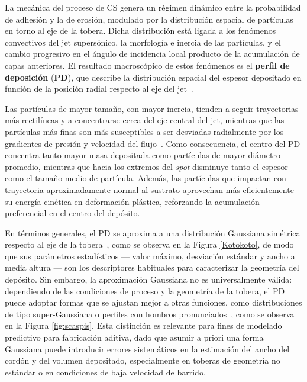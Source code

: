 La mecánica del proceso de CS genera un régimen dinámico entre la probabilidad de adhesión y la 
de erosión, modulado por la distribución espacial de partículas en 
torno al eje de la tobera. Dicha distribución está ligada a los 
fenómenos convectivos del jet supersónico, la morfología e inercia 
de las partículas, y el cambio progresivo en el ángulo de incidencia 
local producto de la acumulación de capas anteriores. El resultado 
macroscópico de estos fenómenos es el \textbf{perfil de deposición} 
(\textbf{PD}), que describe la distribución espacial del espesor 
depositado en función de la posición radial respecto al eje del 
jet~\cite{Papyrin2007}.

Las partículas de mayor tamaño, con mayor inercia, tienden a seguir 
trayectorias más rectilíneas y a concentrarse cerca del eje central 
del jet, mientras que las partículas más finas son más susceptibles 
a ser desviadas radialmente por los gradientes de presión y velocidad 
del flujo~\cite{Wong2013}. Como consecuencia, el centro del PD 
concentra tanto mayor masa depositada como partículas de mayor 
diámetro promedio, mientras que hacia los extremos del \textit{spot} 
disminuye tanto el espesor como el tamaño medio de partícula. 
Además, las partículas que impactan con trayectoria aproximadamente 
normal al sustrato aprovechan más eficientemente su energía cinética 
en deformación plástica, reforzando la acumulación preferencial en 
el centro del depósito.

En términos generales, el PD se aproxima a una distribución 
Gaussiana simétrica respecto al eje de la tobera~\cite{Kotoban2017}, como se observa en la Figura \ref{Kotokoto}, 
de modo que sus parámetros estadísticos --- valor máximo, desviación 
estándar y ancho a media altura --- son los descriptores habituales 
para caracterizar la geometría del depósito. Sin embargo, la 
aproximación Gaussiana no es universalmente válida: dependiendo de 
las condiciones de proceso y la geometría de la tobera, el PD puede 
adoptar formas que se ajustan mejor a otras funciones, como 
distribuciones de tipo super-Gaussiana o perfiles con hombros 
pronunciados~\cite{Vanerio2021}, como se observa en la Figura \ref{fig:scaspis}. Esta distinción es relevante para 
fines de modelado predictivo para fabricación aditiva, dado que asumir a priori una forma 
Gaussiana puede introducir errores sistemáticos en la estimación del 
ancho del cordón y del volumen depositado, especialmente en toberas 
de geometría no estándar o en condiciones de baja velocidad de 
barrido.

